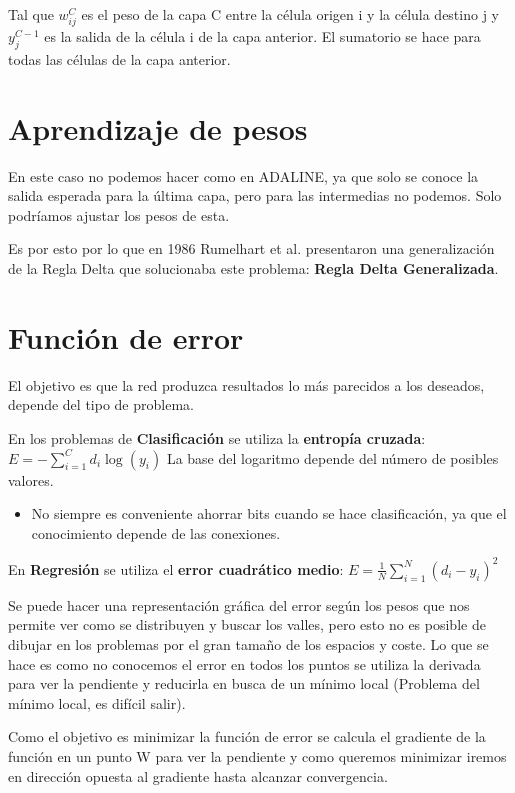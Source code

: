 \documentclass[12pt, twoside, openright]{report} %
\begin{document}
Tal que $w^C_{ij}$ es el peso de la capa C entre la célula origen i y la célula destino j y $y^{C-1}_j$ es la salida de la célula i de la capa anterior. El sumatorio se hace para todas las células de la capa anterior.

\section{Aprendizaje de pesos}
En este caso no podemos hacer como en ADALINE, ya que solo se conoce la salida esperada para la última capa, pero para las intermedias no podemos. Solo podríamos ajustar los pesos de esta. 

Es por esto por lo que en 1986 Rumelhart et al. presentaron una generalización de la Regla Delta que solucionaba este problema: \textbf{Regla Delta Generalizada}.

\section{Función de error}
El objetivo es que la red produzca resultados lo más parecidos a los deseados, depende del tipo de problema.
\pagebreak

En los problemas de \textbf{Clasificación} se utiliza la \textbf{entropía cruzada}: $E=-\sum^C_{i=1}d_i \log (y_i)$ La base del logaritmo depende del número de posibles valores.
\begin{itemize}
	\item No siempre es conveniente ahorrar bits cuando se hace clasificación, ya que el conocimiento depende de las conexiones.
\end{itemize}

En \textbf{Regresión} se utiliza el \textbf{error cuadrático medio}: $E=\frac 1 N \sum^N_{i=1} (d_i-y_i)^2$

Se puede hacer una representación gráfica del error según los pesos que nos permite ver como se distribuyen y buscar los valles, pero esto no es posible de dibujar en los problemas por el gran tamaño de los espacios y coste. Lo que se hace es como no conocemos el error en todos los puntos se utiliza la derivada para ver la pendiente y reducirla en busca de un mínimo local (Problema del mínimo local, es difícil salir).

Como el objetivo es minimizar la función de error se calcula el gradiente de la función en un punto W para ver la pendiente y como queremos minimizar iremos en dirección opuesta al gradiente hasta alcanzar convergencia.
\end{document}
